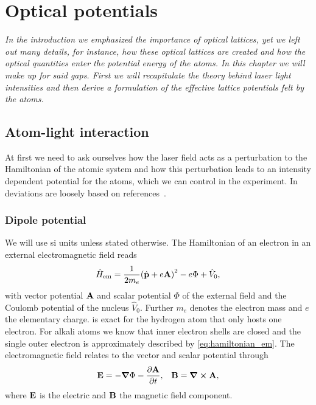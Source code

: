 \chapter{Optical potentials}\label{ch:optical_potentials}

\textit{In the introduction we emphasized the importance of optical lattices,
yet we left out many details, for instance, how these optical lattices are
created and how the optical quantities enter the potential energy of the
atoms. In this chapter we will make up for said gaps. First we will
recapitulate the theory behind laser light intensities and then derive a
formulation of the effective lattice potentials felt by the atoms.}

\section{Atom-light interaction}

At first we need to ask ourselves how the laser field acts as a perturbation
to the Hamiltonian of the atomic system and how this perturbation leads to an
intensity dependent potential for the atoms, which we can control in the
experiment. In deviations are loosely based on
references~\cite{Gerry2004,Jackson2005,Bartelmann2018}.

\subsection{Dipole potential}

We will use \gls{si} units unless stated otherwise. The Hamiltonian of an electron
in an external electromagnetic field reads
\begin{equation}
  \hat{H}_\text{em}
  =\frac{1}{2m_e}{\left(\hat{\vb{p}}+e\vb{A}\right)}^2-e\Phi+\hat{V}_0
  \label{eq:hamiltonian_em},
\end{equation}
with vector potential $\vb{A}$ and scalar potential $\Phi$ of the external
field and the Coulomb potential of the nucleus $\hat{V}_0$. Further $m_e$
denotes the electron mass and $e$ the elementary charge.
 is exact for the hydrogen atom that only hosts one
electron. For alkali atoms we know that inner electron shells are closed and
the single outer electron is approximately described by
\cref{eq:hamiltonian_em}. The electromagnetic field relates to the
vector and scalar potential through
\begin{align}
  \vb{E}=-\grad{\Phi}-\pdv{\vb{A}}{t}, &&
  \vb{B}=\curl{\vb{A}}
  \label{eq:field_em_potentials},
\end{align}
where $\vb{E}$ is the electric and $\vb{B}$ the magnetic field component.

